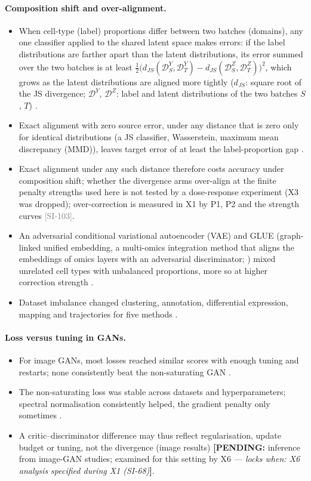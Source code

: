 \documentclass[11pt]{article}
\newcommand{\src}[1]{{\scriptsize\textcolor{gray}{[#1]}}}
\newcommand{\pending}[2]{{\color{BurntOrange}\textbf{[PENDING:} #1 \textit{--- locks when: #2}\textbf{]}}}
\begin{document}
\paragraph{Composition shift and over-alignment.}
\begin{itemize}
\item When cell-type (label) proportions differ between two batches (domains), any one classifier applied to the shared latent space makes errors: if the label distributions are farther apart than the latent distributions, its error summed over the two batches is at least $\tfrac12\bigl(d_{JS}(\mathcal{D}^Y_S,\mathcal{D}^Y_T)-d_{JS}(\mathcal{D}^Z_S,\mathcal{D}^Z_T)\bigr)^2$, which grows as the latent distributions are aligned more tightly ($d_{JS}$: square root of the JS divergence; $\mathcal{D}^Y$, $\mathcal{D}^Z$: label and latent distributions of the two batches $S$, $T$) \citep[Thm.~4.3; binary labels]{zhao2019learning}.
\item Exact alignment with zero source error, under any distance that is zero only for identical distributions (a JS classifier, Wasserstein, maximum mean discrepancy (MMD)), leaves target error of at least the label-proportion gap \citep[Prop.~3.1; binary labels]{wu2019domain}.
\item Exact alignment under any such distance therefore costs accuracy under composition shift; whether the divergence arms over-align at the finite penalty strengths used here is not tested by a dose-response experiment (X3 was dropped); over-correction is measured in X1 by P1, P2 and the strength curves \src{SI-103}.
\item An adversarial conditional variational autoencoder (VAE) and GLUE (graph-linked unified embedding, a multi-omics integration method that aligns the embeddings of omics layers with an adversarial discriminator; \citealp{cao2022multi}) mixed unrelated cell types with unbalanced proportions, more so at higher correction strength \citep{hrovatin2025integrating}.
\item Dataset imbalance changed clustering, annotation, differential expression, mapping and trajectories for five methods \citep{maan2024characterizing}.
\end{itemize}

\paragraph{Loss versus tuning in GANs.}
\begin{itemize}
\item For image GANs, most losses reached similar scores with enough tuning and restarts; none consistently beat the non-saturating GAN \citep{lucic2018gans}.
\item The non-saturating loss was stable across datasets and hyperparameters; spectral normalisation consistently helped, the gradient penalty only sometimes \citep{kurach2019large}.
\item A critic--discriminator difference may thus reflect regularisation, update budget or tuning, not the divergence (image results) \pending{inference from image-GAN studies; examined for this setting by X6}{X6 analysis specified during X1 (SI-68)}.
\end{itemize}
\end{document}
